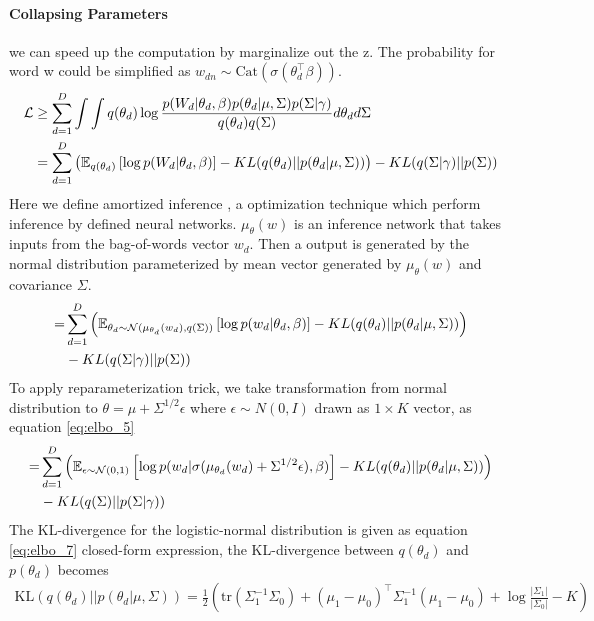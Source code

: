 \paragraph{Collapsing Parameters} we can speed up the computation by marginalize out the z. The probability for word w could be simplified as $ w_{dn}\sim\text{Cat}(\sigma(\theta^\top_{d}\beta)) $.
\begin{align}\label{eq:elbo_3}
\mathcal{L}&\geq\sum_{d=1}^{D}\int\int q(\theta_d)\log\frac{p(W_d|\theta_d,\beta)p(\theta_d|\mu,\Sigma)p(\Sigma|\gamma)}{q(\theta_d)q(\Sigma)}d\theta_d d\Sigma\notag\\
&=\sum_{d=1}^{D}\left(\mathbb{E}_{q(\theta_d)}\left[\log p(W_d|\theta_d,\beta)\right]-KL(q(\theta_d)||p(\theta_d|\mu,\Sigma))\right)-KL(q(\Sigma|\gamma)||p(\Sigma))
\end{align}
Here we define amortized inference \cite{kingma_auto-encoding_2014}, a optimization technique which perform inference by defined neural networks. $ \mu_\theta(w) $ is an inference network that takes inputs from the bag-of-words vector $ w_d $. Then a output is generated by the normal distribution parameterized by mean vector generated by  $ \mu_\theta(w) $ and covariance $ \Sigma $.
\begin{align}\label{eq:elbo_4}
=&\sum_{d=1}^{D}\left(\mathbb{E}_{\theta_d\sim\mathcal{N}(\mu_{\theta_d}(w_d), q(\Sigma))}\left[\log p(w_d|\theta_d,\beta)\right]-KL(q(\theta_d)||p(\theta_d|\mu,\Sigma))\right)\notag\\
&-KL(q(\Sigma|\gamma)||p(\Sigma))
\end{align}
To apply reparameterization trick, we take transformation from normal distribution to $ \theta=\mu+\Sigma^{1/2}\epsilon $ where $ \epsilon\sim N(0,I) $ drawn as $ 1\times K $ vector, as equation \ref{eq:elbo_5}
\begin{align}\label{eq:elbo_5}
=&\sum_{d=1}^{D}\left(\mathbb{E}_{\epsilon\sim\mathcal{N}(0,1)}\left[\log p(w_d|\sigma(\mu_{\theta_d}(w_d)+\Sigma^{1/2}\epsilon),\beta)\right]-KL(q(\theta_d)||p(\theta_d|\mu,\Sigma))\right)\notag\\
&-KL(q(\Sigma)||p(\Sigma|\gamma))
\end{align}
The KL-divergence for the logistic-normal distribution is given as equation \ref{eq:elbo_7} closed-form expression, the KL-divergence between $ q(\theta_d) $ and $ p(\theta_d) $ becomes
\begin{align}\label{eq:elbo_7}
\text{KL}(q(\theta_d)||p(\theta_d|\mu,\Sigma))=\frac{1}{2}\left(\text{tr}(\Sigma_1^{-1}\Sigma_0)+(\mu_1-\mu_0)^\top\Sigma_1^{-1}(\mu_1-\mu_0)+\log\frac{|\Sigma_1|}{|\Sigma_0|}-K\right)
\end{align}

